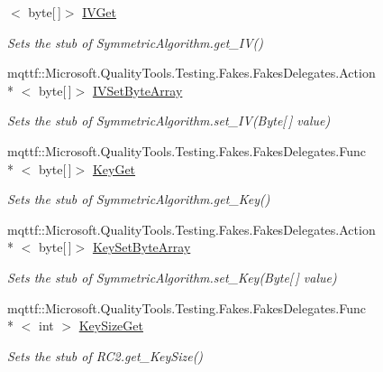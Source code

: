 \begin{DoxyCompactItemize}
$<$ byte\mbox{[}$\,$\mbox{]}$>$ \hyperlink{class_system_1_1_security_1_1_cryptography_1_1_fakes_1_1_stub_r_c2_a2bf5179dc3527b36b0da4087f4f6c5d6}{I\-V\-Get}
\begin{DoxyCompactList}\small\item\em Sets the stub of Symmetric\-Algorithm.\-get\-\_\-\-I\-V()\end{DoxyCompactList}\item 
mqttf\-::\-Microsoft.\-Quality\-Tools.\-Testing.\-Fakes.\-Fakes\-Delegates.\-Action\\*
$<$ byte\mbox{[}$\,$\mbox{]}$>$ \hyperlink{class_system_1_1_security_1_1_cryptography_1_1_fakes_1_1_stub_r_c2_afb32f67ca67afd4171ad4143cc65c063}{I\-V\-Set\-Byte\-Array}
\begin{DoxyCompactList}\small\item\em Sets the stub of Symmetric\-Algorithm.\-set\-\_\-\-I\-V(\-Byte\mbox{[}$\,$\mbox{]} value)\end{DoxyCompactList}\item 
mqttf\-::\-Microsoft.\-Quality\-Tools.\-Testing.\-Fakes.\-Fakes\-Delegates.\-Func\\*
$<$ byte\mbox{[}$\,$\mbox{]}$>$ \hyperlink{class_system_1_1_security_1_1_cryptography_1_1_fakes_1_1_stub_r_c2_a0d17c95a2be98d7354bc4ee03b4ee3bd}{Key\-Get}
\begin{DoxyCompactList}\small\item\em Sets the stub of Symmetric\-Algorithm.\-get\-\_\-\-Key()\end{DoxyCompactList}\item 
mqttf\-::\-Microsoft.\-Quality\-Tools.\-Testing.\-Fakes.\-Fakes\-Delegates.\-Action\\*
$<$ byte\mbox{[}$\,$\mbox{]}$>$ \hyperlink{class_system_1_1_security_1_1_cryptography_1_1_fakes_1_1_stub_r_c2_a56a396ad7e614209c48f87680231a93b}{Key\-Set\-Byte\-Array}
\begin{DoxyCompactList}\small\item\em Sets the stub of Symmetric\-Algorithm.\-set\-\_\-\-Key(\-Byte\mbox{[}$\,$\mbox{]} value)\end{DoxyCompactList}\item 
mqttf\-::\-Microsoft.\-Quality\-Tools.\-Testing.\-Fakes.\-Fakes\-Delegates.\-Func\\*
$<$ int $>$ \hyperlink{class_system_1_1_security_1_1_cryptography_1_1_fakes_1_1_stub_r_c2_aecd0d81979ddb8c4f9953066941632e8}{Key\-Size\-Get}
\begin{DoxyCompactList}\small\item\em Sets the stub of R\-C2.\-get\-\_\-\-Key\-Size()\end{DoxyCompactList}\item 

\end{DoxyCompactItemize}

